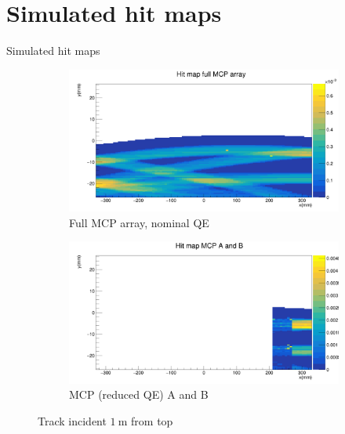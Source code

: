 \documentclass{beamer}
\begin{document}
\section{Simulated hit maps}
\begin{frame}{Simulated hit maps}
  \begin{figure}
    \centering
    \vspace{-0.2cm}
    \begin{subfigure}{0.5\textwidth}
      \includegraphics[width = 1.0\textwidth]{Plots/HitMapMCPFullMiddle.png}
      \caption{Full MCP array, nominal QE}
    \end{subfigure}%
    \begin{subfigure}{0.5\textwidth}
      \includegraphics[width = 1.0\textwidth]{Plots/HitMapMCPABMiddle.png}
      \caption{MCP (reduced QE) A and B}
    \end{subfigure}
    \caption{Track incident $\SI{1}{\meter}$ from top}
  \end{figure}
\end{frame}
\end{document}

